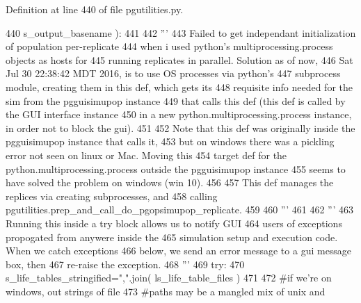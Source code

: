 Definition at line 440 of file pgutilities.\+py.


\begin{DoxyCode}
440             s\_output\_basename ):
441 
442     \textcolor{stringliteral}{'''}
443 \textcolor{stringliteral}{    Failed to get independant initialization of population per-replicate}
444 \textcolor{stringliteral}{    when i used python's multiprocessing.process objects as hosts for }
445 \textcolor{stringliteral}{    running replicates in parallel.  Solution as of now, }
446 \textcolor{stringliteral}{    Sat Jul 30 22:38:42 MDT 2016, is to use OS processes via python's }
447 \textcolor{stringliteral}{    subprocess module, creating them in this def, which gets its}
448 \textcolor{stringliteral}{    requisite info needed for the sim from the pgguisimupop instance}
449 \textcolor{stringliteral}{    that calls this def (this def is called by the GUI interface instance}
450 \textcolor{stringliteral}{    in a new python.multiprocessing.process instance, in order not to block the gui).}
451 \textcolor{stringliteral}{}
452 \textcolor{stringliteral}{    Note that this def was originally inside the pgguisimupop instance that calls it,}
453 \textcolor{stringliteral}{    but on windows there was a pickling error not seen on linux or Mac.  Moving this}
454 \textcolor{stringliteral}{    target def for the python.multiprocessing.process outside the pgguisimupop instance}
455 \textcolor{stringliteral}{    seems to have solved the problem on windows (win 10).}
456 \textcolor{stringliteral}{}
457 \textcolor{stringliteral}{    This def manages the replices via creating subprocesses, and }
458 \textcolor{stringliteral}{    calling pgutilities.prep\_and\_call\_do\_pgopsimupop\_replicate.}
459 \textcolor{stringliteral}{}
460 \textcolor{stringliteral}{    '''} 
461 
462     \textcolor{stringliteral}{''' }
463 \textcolor{stringliteral}{    Running this inside a try block allows us to notify GUI}
464 \textcolor{stringliteral}{    users of exceptions propogated from anywere inside the }
465 \textcolor{stringliteral}{    simulation setup and execution code. When we catch exceptions }
466 \textcolor{stringliteral}{    below, we send an error message to a gui message box, then}
467 \textcolor{stringliteral}{    re-raise the exception. }
468 \textcolor{stringliteral}{    '''}
469     \textcolor{keywordflow}{try}:
470         s\_life\_tables\_stringified=\textcolor{stringliteral}{","}.join( ls\_life\_table\_files )
471 
472         \textcolor{comment}{#if we're on windows, out strings of file}
473         \textcolor{comment}{#paths may be a mangled mix of unix and }

\end{DoxyCode}
